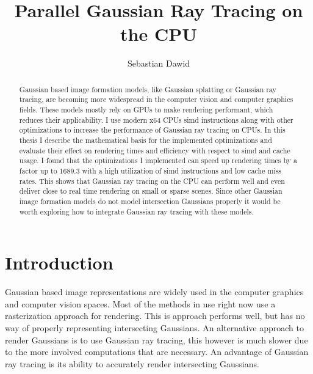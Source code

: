 \documentclass[a4paper, 11pt]{memoir}
\title{Parallel Gaussian Ray Tracing on the CPU}
\author{Sebastian Dawid}
\begin{document}
    \frontmatter
    \smarttitle
    \newpage
    \tableofcontents*

    \clearpage
    \thispagestyle{abs}
    \abstractintoc
    \begin{abstract}
        Gaussian based image formation models, like Gaussian splatting or Gaussian ray tracing, are becoming more
        widespread in the computer vision and computer graphics fields.
        These models mostly rely on GPUs to make rendering performant, which reduces their applicability.
        I use modern x64 CPUs \gls{simd} instructions along with other optimizations to increase the performance of
        Gaussian ray tracing on CPUs.
        In this thesis I describe the mathematical basis for the implemented optimizations and evaluate their effect on
        rendering times and efficiency with respect to \gls{simd} and cache usage.
        I found that the optimizations I implemented can speed up rendering times by a factor up to $1689.3$ with a high
        utilization of \gls{simd} instructions and low cache miss rates.
        This shows that Gaussian ray tracing on the CPU can perform well and even deliver close to real time rendering
        on small or sparse scenes.
        Since other Gaussian image formation models do not model intersection Gaussians properly it would be worth exploring
        how to integrate Gaussian ray tracing with these models.
    \end{abstract}

    \mainmatter
    \chapter{Introduction}
    Gaussian based image representations are widely used in the computer graphics and computer vision spaces. Most of
    the methods in use right now use a rasterization approach for rendering. This is approach performs well, but has no
    way of properly representing intersecting Gaussians. An alternative approach to render Gaussians is to use Gaussian
    ray tracing, this however is much slower due to the more involved computations that are necessary. An advantage of
    Gaussian ray tracing is its ability to accurately render intersecting Gaussians.
\end{document}
